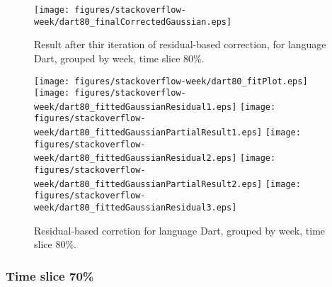 \begin{figure}[]
\centering
{\texttt{[image: figures/stackoverflow-week/dart80\_finalCorrectedGaussian.eps]}}
\caption{Result after thir iteration of residual-based correction, for language Dart, grouped by week, time slice 80\%.}
\end{figure}


\begin{figure}[hb]
\centering
{}
{\texttt{[image: figures/stackoverflow-week/dart80\_fitPlot.eps]}}
{\texttt{[image: figures/stackoverflow-week/dart80\_fittedGaussianResidual1.eps]}}
{\texttt{[image: figures/stackoverflow-week/dart80\_fittedGaussianPartialResult1.eps]}}
{\texttt{[image: figures/stackoverflow-week/dart80\_fittedGaussianResidual2.eps]}}
{\texttt{[image: figures/stackoverflow-week/dart80\_fittedGaussianPartialResult2.eps]}}
{\texttt{[image: figures/stackoverflow-week/dart80\_fittedGaussianResidual3.eps]}}
\caption{Residual-based corretion for language Dart, grouped by week, time slice 80\%.}
\end{figure}


\clearpage 
\newpage 


\FloatBarrier

\subsubsection{Time slice 70\%}

